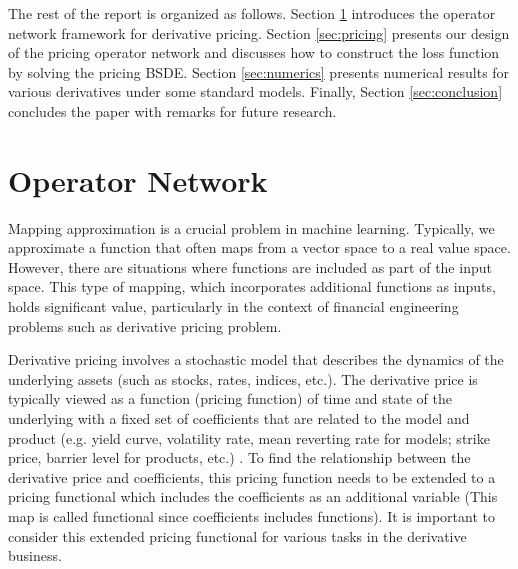 \documentclass[11pt,a4paper]{article}
\theoremstyle{remark}
\begin{document}
	The rest of the report is organized as follows. Section \ref{sec:OperatorNetwork} introduces the operator network framework for derivative pricing. Section \ref{sec:pricing} presents our design of the pricing operator network and discusses how to construct the loss function by solving the pricing BSDE. Section \ref{sec:numerics} presents numerical results for various derivatives under some standard models. Finally, Section \ref{sec:conclusion} concludes the paper with remarks for future research. 
	
	\section{Operator Network}\label{sec:OperatorNetwork}
    Mapping approximation is a crucial problem in machine learning. Typically, we approximate a function that often maps from a vector space to a real value space. However, there are situations where functions are included as part of the input space. This type of mapping, which incorporates additional functions as inputs, holds significant value, particularly in the context of financial engineering problems such as derivative pricing problem. 
    
    Derivative pricing involves a stochastic model that describes the dynamics of the underlying assets (such as stocks, rates, indices, etc.). The derivative price is typically viewed as a function (pricing function) of time and state of the underlying with a fixed set of coefficients that are related to the model and product (e.g. yield curve, volatility rate, mean reverting rate for models; strike price, barrier level for products, etc.) . To find the relationship between the derivative price and coefficients, this pricing function needs to be extended to a pricing functional which includes the coefficients as an additional variable (This map is called functional since coefficients includes functions). It is important to consider this extended pricing functional for various tasks in the derivative business.  
    
\end{document}
